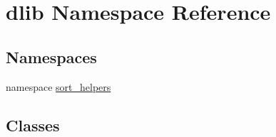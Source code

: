 \hypertarget{namespacedlib}{
\section{dlib Namespace Reference}
\label{namespacedlib}
}
\subsection*{Namespaces}
\begin{DoxyCompactItemize}
\item 
namespace \hyperlink{namespacedlib_1_1sort__helpers}{sort\_\-helpers}
\end{DoxyCompactItemize}
\subsection*{Classes}
